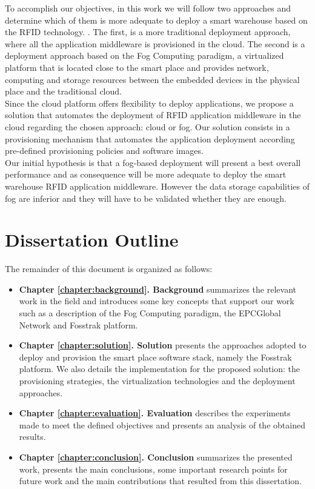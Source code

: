To accomplish our objectives, in this work we will follow two approaches and determine which of them
is more adequate to deploy a smart warehouse based on the \gls{RFID} technology. . The first, is a
more traditional deployment approach, where all the application middleware is provisioned in the cloud.
The second is a deployment approach based on the Fog Computing\cite{bonomi2012fog} paradigm,
a virtualized platform that is located close to the smart place and provides network, computing
and storage resources between the embedded devices in the physical place and the traditional cloud.\\

Since the cloud platform offers flexibility to deploy applications, we propose a solution that
automates the deployment of \gls{RFID} application middleware in the cloud regarding the chosen approach:
cloud or fog. Our solution consists in a provisioning mechanism that automates the application
deployment according pre-defined provisioning policies and software images.\\

Our initial hypothesis is that a fog-based deployment will present a best overall performance and as
consequence will be more adequate to deploy the smart warehouse \gls{RFID} application middleware.
However the data storage capabilities of fog are inferior and they will have to be
validated whether they are enough.

\section{Dissertation Outline}
\label{section:outline}
The remainder of this document is organized as follows:
\begin{itemize}
  \item \textbf{Chapter \ref{chapter:background}. Background} summarizes the relevant work in the field and
  introduces some key concepts that support our work such as a description of the Fog Computing paradigm,
  the EPCGlobal Network and Fosstrak platform.
  \item \textbf{Chapter \ref{chapter:solution}. Solution} presents the approaches adopted to deploy
  and provision the smart place software stack, namely the Fosstrak platform. We also details the implementation
  for the proposed solution: the provisioning strategies, the virtualization technologies and the
  deployment approaches.
  \item \textbf{Chapter \ref{chapter:evaluation}. Evaluation} describes the experiments made to meet
  the defined objectives and presents an analysis of the obtained results.
  \item \textbf{Chapter \ref{chapter:conclusion}. Conclusion} summarizes the presented work,
  presents the main conclusions, some important research points for future work and the main contributions
  that resulted from this dissertation.
\end{itemize}
